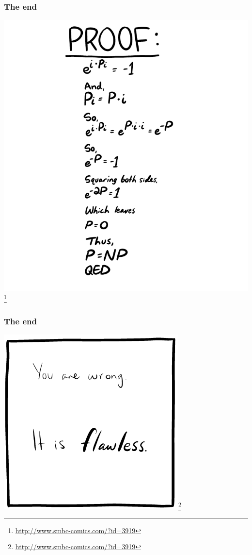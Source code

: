 \documentclass[aspectratio=169]{beamer}
\begin{document}
\begin{frame}
\begin{center}
\frametitle{The end}
\includegraphics[scale=0.2]{smbc_comic}\footnote{\url{http://www.smbc-comics.com/?id=3919}}
\end{center}
\end{frame}

\begin{frame}
\begin{center}
\frametitle{The end}
\includegraphics[scale=0.5]{smbc_comic_votey}\footnote{\url{http://www.smbc-comics.com/?id=3919}}
\end{center}
\end{frame}
\end{document}

